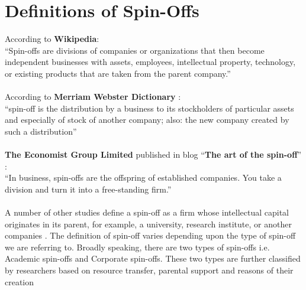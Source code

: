 \newpage

\section{Definitions of Spin-Offs\label{sec:defs_spinoffs}}

According to \textbf{Wikipedia}\cite{7}:
\\
``Spin-offs are divisions of companies or organizations that then become independent businesses
with assets, employees, intellectual property, technology, or existing products that are taken from
the parent company.''
\\
\\
According to \textbf{Merriam Webster Dictionary} \cite{11}:
\\
``spin-off is the distribution by a business to its stockholders of particular assets and especially of
stock of another company; also: the new company created by such a distribution''
\\
\\
\textbf{The Economist Group Limited} published in blog ``\textbf{The art of the spin-off}'' \cite{12}:
\\
``In business, spin-offs are the offspring of established companies. You take a division and turn it
into a free-standing firm.''
\\
\\
A number of other studies define a spin-off as a firm whose intellectual capital originates in its
parent, for example, a university, research institute, or another companies \cite{13}.
The definition of spin-off varies depending upon the type of spin-off we are referring to. Broadly
speaking, there are two types of spin-offs i.e. Academic spin-offs and Corporate spin-offs. These
two types are further classified by researchers based on resource transfer, parental support and
reasons of their creation \cite{14}
